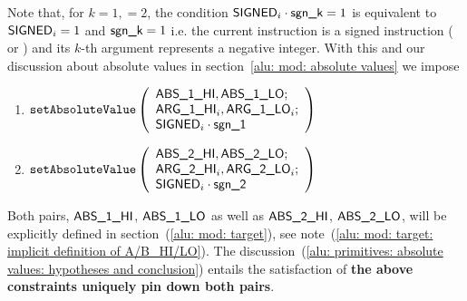 Note that, for $k=1,=2$, the condition $\textsf{SIGNED}_{i} \cdot \textsf{sgn\_k} = 1$ is equivalent to
$\textsf{SIGNED}_{i} = 1$ and 
$\textsf{sgn\_k} = 1$
i.e. the current instruction is a signed instruction ( or ) 
and its $k$-th argument represents a negative integer. With this and our discussion about absolute values in 
section~\ref{alu: mod: absolute values} we impose
\begin{enumerate}
	\item $\texttt{setAbsoluteValue}
		\left( \begin{array}{l}
			\textsf{ABS}\textsf{\_1}\textsf{\_HI}, \textsf{ABS}\textsf{\_1}\textsf{\_LO};              \\
			\textsf{ARG}\textsf{\_1}\textsf{\_HI}_{i}, \textsf{ARG}\textsf{\_1}\textsf{\_LO}_{i};      \\
			\textsf{SIGNED}_{i} \cdot \textsf{sgn\_1} \\
		\end{array} \right)$
	\item $\texttt{setAbsoluteValue}
		\left( \begin{array}{l}
			\textsf{ABS}\textsf{\_2}\textsf{\_HI}, \textsf{ABS}\textsf{\_2}\textsf{\_LO};              \\
			\textsf{ARG}\textsf{\_2}\textsf{\_HI}_{i}, \textsf{ARG}\textsf{\_2}\textsf{\_LO}_{i};      \\
			\textsf{SIGNED}_{i} \cdot \textsf{sgn\_2} \\
		\end{array} \right)$
\end{enumerate}
\saNote{}
Both pairs, $\textsf{ABS}\textsf{\_1}\textsf{\_HI}$, $\textsf{ABS}\textsf{\_1}\textsf{\_LO}$ as well as $\textsf{ABS}\textsf{\_2}\textsf{\_HI}$, $\textsf{ABS}\textsf{\_2}\textsf{\_LO}$,
will be explicitly defined in section~(\ref{alu: mod: target}),
see note~(\ref{alu: mod: target: implicit definition of A/B_HI/LO}).
The discussion~(\ref{alu: primitives: absolute values: hypotheses and conclusion})
entails the satisfaction of \textbf{the above constraints uniquely pin down both pairs}.
